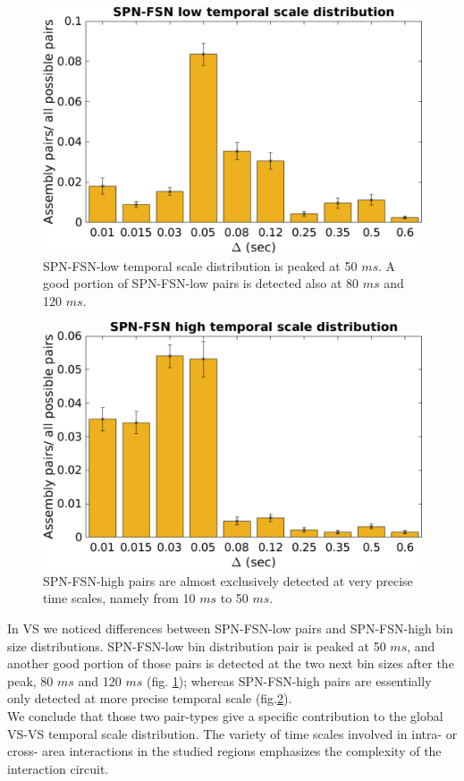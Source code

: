 \begin{figure}
    \centering
    \includegraphics[scale=0.5]{figures/SPN_FSNlow1.pdf}
    \caption{SPN-FSN-low temporal scale distribution is peaked at 50 $ms$. A good portion of SPN-FSN-low pairs is detected also at 80 $ms$ and 120 $ms$.}
    \label{fig:SPN_FSNlowBin}
\end{figure}
\begin{figure}
    \centering
    \includegraphics[scale=0.5]{figures/SPN_FSNhigh1.pdf}
    \caption{SPN-FSN-high pairs are almost exclusively detected at very precise time scales, namely from 10 $ms$ to 50 $ms$.}
    \label{fig:SPN_FSNhighBin}
\end{figure}
In VS we noticed differences between SPN-FSN-low pairs and SPN-FSN-high bin size distributions. SPN-FSN-low bin distribution pair is peaked at 50 $ms$, and another good portion of those pairs is detected at the two next bin sizes after the peak, 80 $ms$ and 120 $ms$ (fig. \ref{fig:SPN_FSNlowBin}); whereas SPN-FSN-high pairs are essentially only detected at more precise temporal scale (fig.\ref{fig:SPN_FSNhighBin}).\\We conclude that those two pair-types give a specific contribution to the global VS-VS temporal scale distribution. The variety of time scales involved in intra- or cross- area interactions in the studied regions emphasizes the complexity of the interaction circuit.
